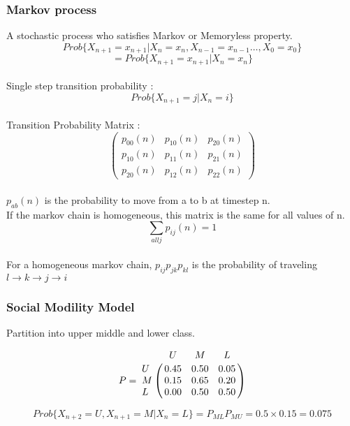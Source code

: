 \documentclass{article}
\begin{document}
	\subsubsection{Markov process}
	A stochastic process who satisfies Markov or Memoryless property. 
	\[Prob\{ X_{n+1} = x_{n+1} | X_n = x_n, X_{n-1} = x_{n-1} \ldots , X_0 = x_0 \}\]
	\[= Prob\{ X_{n+1} = x_{n+1} | X_n = x_n\}\]
	\\Single step transition probability :
	\[Prob\{X_{n+1} = j | X_n = i \}\]
	\\Transition Probability Matrix : 
	\[ \left( \begin{array}{ccc}
            p_{00}(n) & p_{10}(n) & p_{20}(n) \\
			p_{10}(n) & p_{11}(n) & p_{21}(n) \\
			p_{20}(n) & p_{12}(n) & p_{22}(n) 
	\end{array} \right)\] 
 	\\$p_{ab}(n)$ is the probability to move from a to b at timestep n.
 	\\If the markov chain is homogeneous, this matrix is the same for all values of n. 
	\\$$\sum\limits_{all j}{p_{ij}(n)} = 1$$
	\\For a homogeneous markov chain, $p_{ij} p_{jk} p_{kl}$ is the probability of traveling $l\rightarrow k\rightarrow j\rightarrow i$
	\\\subsubsection{ Social Modility Model }
	Partition into upper middle and lower class. 
	
	\[P = \bordermatrix{   
              & U    & M    & L    \cr
            U & 0.45 & 0.50 & 0.05 \cr
			M & 0.15 & 0.65 & 0.20 \cr
			L & 0.00 & 0.50 & 0.50  }
    \]

	$$Prob\{ X_{n+2} = U, X_{n+1} = M | X_n = L \} = P_{ML}P_{MU} = 0.5 \times 0.15 = 0.075 $$
 	 
\end{document}
